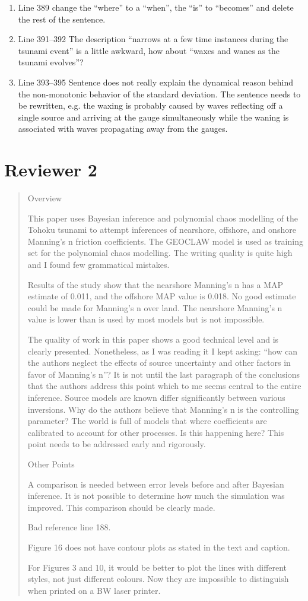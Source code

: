 \documentclass[]{article}
\begin{document}
\begin{enumerate}
\item Line 389 change the ``where'' to a ``when'', the ``is'' to ``becomes'' and delete the rest of the sentence.
\item Line 391–392 The description ``narrows at a few time instances during the tsunami event'' is a little
awkward, how about ``waxes and wanes as the tsunami evolves''?
\item Line 393–395 Sentence does not really explain the dynamical reason behind the non-monotonic behavior of the standard deviation. The sentence needs to be rewritten, e.g. the waxing is probably caused by waves reflecting off a single source and arriving at the gauge simultaneously while the waning is associated with waves propagating away from the gauges.
\end{enumerate}

\section*{Reviewer 2}
\begin{quote}      
Overview

This paper uses Bayesian inference and polynomial chaos modelling of the Tohoku tsunami to attempt inferences of nearshore, offshore, and onshore Manning's n friction coefficients. The GEOCLAW model is used as training set for the polynomial chaos modelling. The writing quality is quite high and I found few grammatical mistakes.

Results of the study show that the nearshore Manning's n has a MAP estimate of 0.011, and the offshore MAP value is 0.018. No good estimate could be made for Manning's n over land. The nearshore Manning's n value is lower than is used by most models but is not impossible.

The quality of work in this paper shows a good technical level and is clearly presented. Nonetheless, as I was reading it I kept asking: ``how can the authors neglect the effects of source uncertainty and other factors in favor of Manning's n''? It is not until the last paragraph of the conclusions that the authors address this point which to me seems central to the entire inference. Source models are known differ significantly between various inversions. Why do the authors believe that Manning's n is the controlling parameter? The world is full of models that where coefficients are calibrated to account for other processes. Is this happening here? This point needs to be addressed early and rigorously.

Other Points

A comparison is needed between error levels before and after Bayesian inference. It is not possible to determine how much the simulation was improved. This comparison should be clearly made.

Bad reference line 188.

Figure 16 does not have contour plots as stated in the text and caption.

For Figures 3 and 10, it would be better to plot the lines with different styles, not just different colours. Now they are impossible to distinguish when printed on a BW laser printer.
\end{quote}
 
\end{document}
